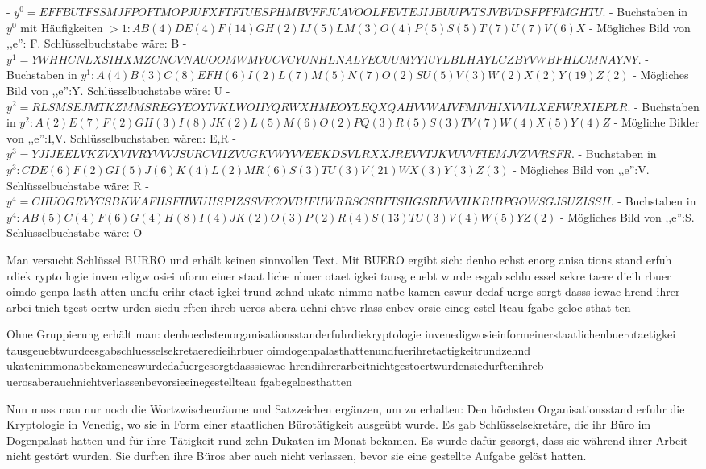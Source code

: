 \documentclass[a4paper]{article}
\begin{document}
\begin{multicols}{3}
    - $y^0 =EFFBUTFSSMJFPOFTMOPJUFXFTFTUESPHMBVFFJUAVOOLFEVTEJIJBUUPVTSJVBVDSFPFFMGHTU$.
    - Buchstaben in $y^0$ mit Häufigkeiten $>1:AB(4)DE(4)F(14)GH(2)IJ(5)LM(3)O(4)P(5)S(5)T(7)U(7)V(6)X$
    - Mögliches Bild von ,,e'': F. Schlüsselbuchstabe wäre: B
    - $y^1 =YWHHCNLXSIHXMZCNCVNAUOOMWMYUCVCYUNHLNALYECUUMYYIUYLBLHAYLCZBYVWBFHLCMNAYNY$.
    - Buchstaben in $y^1:A(4)B(3)C(8)EFH(6)I(2)L(7)M(5)N(7)O(2)SU(5)V(3)W(2)X(2)Y(19)Z(2)$
    - Mögliches Bild von ,,e'':Y. Schlüsselbuchstabe wäre: U
    - $y^2 =RLSMSEJMTKZMMSREGYEOYIVKLWOIIYQRWXHMEOYLEQXQAHVVWAIVFMIVHIXVVILXEFWRXIEPLR$.
    - Buchstaben in $y^2:A(2)E(7)F(2)GH(3)I(8)JK(2)L(5)M(6)O(2)PQ(3)R(5)S(3)TV(7)W(4)X(5)Y(4)Z$
    - Mögliche Bilder von ,,e'':I,V. Schlüsselbuchstaben wären: E,R
    - $y^3 =YJIJEELVKZVXVIVRYVVVJSURCVIIZVUGKVWYVVEEKDSVLRXXJREVVTJKVUVVFIEMJVZVVRSFR$.
    - Buchstaben in $y^3 :CDE(6)F(2)GI(5)J(6)K(4)L(2)MR(6)S(3)TU(3)V(21)WX(3)Y(3)Z(3)$
    - Mögliches Bild von ,,e'':V. Schlüsselbuchstabe wäre: R
    - $y^4 =CHUOGRVYCSBKWAFHSFHWUHSPIZSSVFCOVBIFHWRRSCSBFTSHGSRFWVHKBIBPGOWSGJSUZISSH$.
    - Buchstaben in $y^4 :AB(5)C(4)F(6)G(4)H(8)I(4)JK(2)O(3)P(2)R(4)S(13)TU(3)V(4)W(5)YZ(2)$
    - Mögliches Bild von ,,e'':S. Schlüsselbuchstabe wäre: O

    Man versucht Schlüssel BURRO und erhält keinen sinnvollen Text. Mit BUERO ergibt sich:
    denho echst enorg anisa tions stand erfuh rdiek rypto logie
    inven edigw osiei nform einer staat liche nbuer otaet igkei
    tausg euebt wurde esgab schlu essel sekre taere dieih rbuer
    oimdo genpa lasth atten undfu erihr etaet igkei trund zehnd
    ukate nimmo natbe kamen eswur dedaf uerge sorgt dasss iewae
    hrend ihrer arbei tnich tgest oertw urden siedu rften ihreb
    ueros abera uchni chtve rlass enbev orsie eineg estel lteau
    fgabe geloe sthat ten

    Ohne Gruppierung erhält man:
    denhoechstenorganisationsstanderfuhrdiekryptologie
    invenedigwosieinformeinerstaatlichenbuerotaetigkei
    tausgeuebtwurdeesgabschluesselsekretaeredieihrbuer
    oimdogenpalasthattenundfuerihretaetigkeitrundzehnd
    ukatenimmonatbekameneswurdedafuergesorgtdasssiewae
    hrendihrerarbeitnichtgestoertwurdensiedurftenihreb
    uerosaberauchnichtverlassenbevorsieeinegestellteau
    fgabegeloesthatten

    Nun muss man nur noch die Wortzwischenräume und Satzzeichen ergänzen, um zu erhalten:
    Den höchsten Organisationsstand erfuhr die Kryptologie in Venedig, wo sie in Form einer staatlichen Bürotätigkeit ausgeübt wurde. Es gab Schlüsselsekretäre, die ihr Büro im Dogenpalast hatten und für ihre Tätigkeit rund zehn Dukaten im Monat bekamen. Es wurde dafür gesorgt, dass sie während ihrer Arbeit nicht gestört wurden. Sie durften ihre Büros aber auch nicht verlassen, bevor sie eine gestellte Aufgabe gelöst hatten.


\end{multicols}
\end{document}
